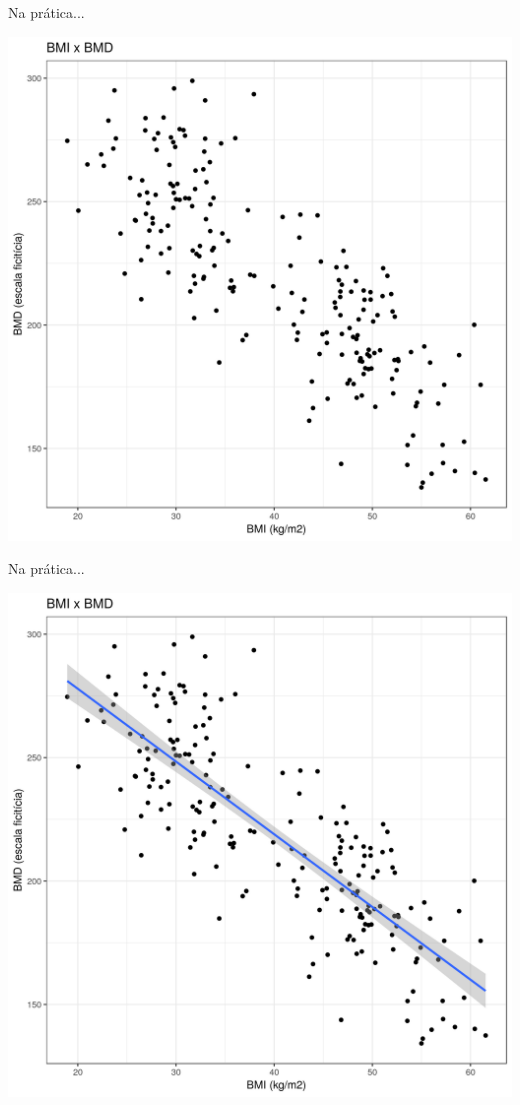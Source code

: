 \documentclass{beamer}
\begin{document}
\begin{frame}{Na prática...}
  \begin{center}
    \includegraphics[height=.9\textheight]{Cap18-19/pratica-rls1}
  \end{center}
\end{frame}

\begin{frame}[label=plot2]{Na prática...}
  \begin{center}
    \includegraphics[height=.9\textheight]{Cap18-19/pratica-rls2}
  \end{center}
\end{frame}
\end{document}
